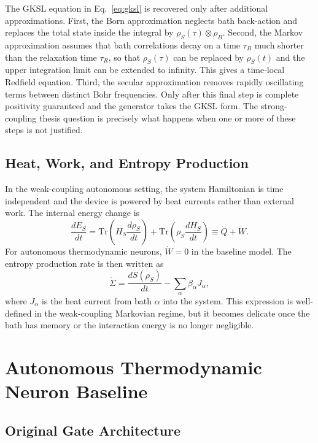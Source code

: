 \documentclass[11pt]{article}
\begin{document}
The GKSL equation in Eq.~\eqref{eq:gksl} is recovered only after additional approximations.
First, the Born approximation neglects bath back-action and replaces the total state inside
the integral by $\rho_S(\tau)\otimes\rho_B$.  Second, the Markov approximation assumes that
bath correlations decay on a time $\tau_B$ much shorter than the relaxation time $\tau_R$,
so that $\rho_S(\tau)$ can be replaced by $\rho_S(t)$ and the upper integration limit can be
extended to infinity.  This gives a time-local Redfield equation.  Third, the secular
approximation removes rapidly oscillating terms between distinct Bohr frequencies.  Only
after this final step is complete positivity guaranteed and the generator takes the GKSL
form.  The strong-coupling thesis question is precisely what happens when one or more of
these steps is not justified.

\subsection{Heat, Work, and Entropy Production}

In the weak-coupling autonomous setting, the system Hamiltonian is time independent and the
device is powered by heat currents rather than external work.  The internal energy change is
\begin{equation}
    \frac{dE_S}{dt}
    =
    \mathrm{Tr}\!\left(H_S\frac{d\rho_S}{dt}\right)
    +
    \mathrm{Tr}\!\left(\rho_S\frac{dH_S}{dt}\right)
    \equiv
    \dot Q+\dot W .
\end{equation}
For autonomous thermodynamic neurons, $\dot W=0$ in the baseline model.  The entropy
production rate is then written as
\begin{equation}
    \dot\Sigma
    =
    \frac{dS(\rho_S)}{dt}
    -
    \sum_\alpha \beta_\alpha J_\alpha ,
\end{equation}
where $J_\alpha$ is the heat current from bath $\alpha$ into the system.  This expression is
well-defined in the weak-coupling Markovian regime, but it becomes delicate once the bath
has memory or the interaction energy is no longer negligible.

\section{Autonomous Thermodynamic Neuron Baseline}

\subsection{Original Gate Architecture}
\end{document}
